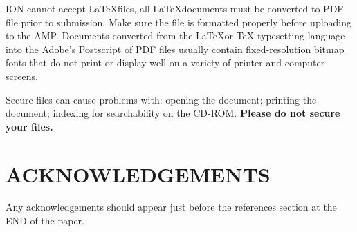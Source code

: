 \documentclass[letterpaper,times]{IONconf}
\begin{document}
ION cannot accept \LaTeX files, all \LaTeX documents must be converted to PDF file prior to submission. Make sure the file is formatted properly before uploading to the AMP.  Documents converted from the \LaTeX or TeX typesetting language into the Adobe’s Postscript of PDF files usually contain fixed-resolution bitmap fonts that do not print or display well on a variety of printer and computer screens.

Secure files can cause problems with: opening the document; printing the document; indexing for searchability on the CD-ROM. \textbf{\large{Please do not secure your files.}}


\section*{ACKNOWLEDGEMENTS}

Any acknowledgements should appear just before the references section at the END of the paper.

%
\printbibliography
\end{document}
